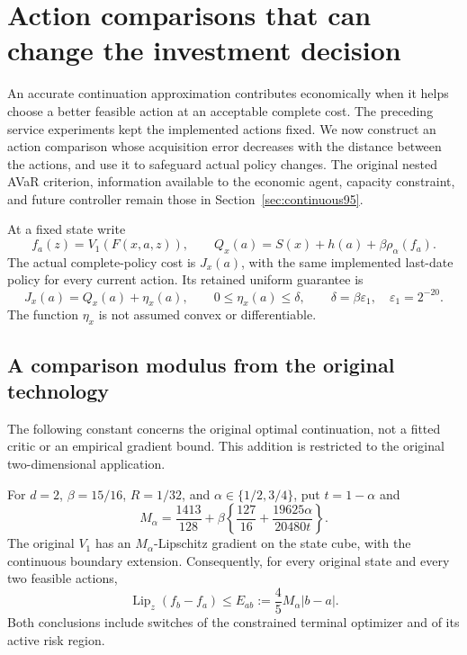 \section{Action comparisons that can change the investment decision}
\label{sec:improvement120}
An accurate continuation approximation contributes economically when it
helps choose a better feasible action at an acceptable complete cost.
The preceding service experiments kept the implemented actions fixed.
We now construct an action comparison whose acquisition error decreases
with the distance between the actions, and use it to safeguard actual
policy changes.  The original nested AVaR criterion, information available
to the economic agent, capacity constraint, and future controller remain
those in Section~\ref{sec:continuous95}.

At a fixed state write
\[
 f_a(z)=V_1(F(x,a,z)),\qquad
 Q_x(a)=S(x)+h(a)+\beta\rho_\alpha(f_a).
\]
The actual complete-policy cost is $J_x(a)$, with the same implemented
last-date policy for every current action.  Its retained uniform guarantee is
\begin{equation}\label{eq:future120}
 J_x(a)=Q_x(a)+\eta_x(a),\qquad
 0\le\eta_x(a)\le\delta,\qquad
 \delta=\beta\varepsilon_1,\quad \varepsilon_1=2^{-20}.
\end{equation}
The function $\eta_x$ is not assumed convex or differentiable.

\subsection{A comparison modulus from the original technology}
The following constant concerns the original optimal continuation, not a
fitted critic or an empirical gradient bound.  This addition is restricted
to the original two-dimensional application.

\begin{theorem}
\label{thm:modulus120}
For $d=2$, $\beta=15/16$, $R=1/32$, and
$\alpha\in\{1/2,3/4\}$, put $t=1-\alpha$ and
\begin{equation}\label{eq:modulus120}
 M_\alpha=\frac{1413}{128}
       +\beta\left\{\frac{127}{16}
                 +\frac{19625\alpha}{20480t}\right\}.
\end{equation}
The original $V_1$ has an $M_\alpha$-Lipschitz gradient on the state
cube, with the continuous boundary extension.  Consequently, for every
original state and every two feasible actions,
\begin{equation}\label{eq:mixedmodulus120}
 \operatorname{Lip}_z(f_b-f_a)
 \le E_{ab}:=\frac45M_\alpha|b-a|.
\end{equation}
Both conclusions include switches of the constrained terminal optimizer
and of its active risk region.
\end{theorem}

